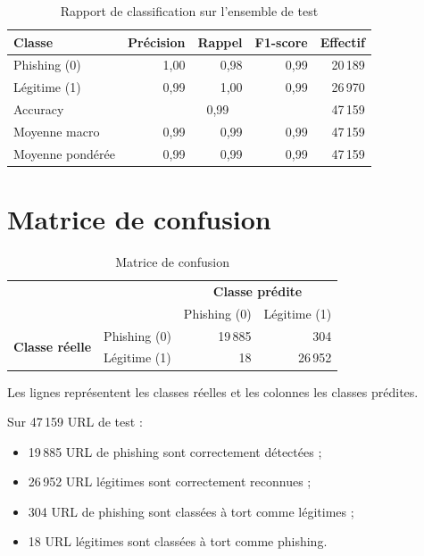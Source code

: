 \documentclass[11pt,a4paper]{report}
\begin{document}
\begin{table}[H]
\centering
\caption{Rapport de classification sur l'ensemble de test}
\begin{tabular}{lrrrr}
\toprule
\textbf{Classe} & \textbf{Précision} & \textbf{Rappel} &
\textbf{F1-score} & \textbf{Effectif}\\
\midrule
Phishing (0) & 1,00 & 0,98 & 0,99 & 20\,189\\
Légitime (1) & 0,99 & 1,00 & 0,99 & 26\,970\\
\midrule
Accuracy & \multicolumn{3}{c}{0,99} & 47\,159\\
Moyenne macro & 0,99 & 0,99 & 0,99 & 47\,159\\
Moyenne pondérée & 0,99 & 0,99 & 0,99 & 47\,159\\
\bottomrule
\end{tabular}
\end{table}

\section{Matrice de confusion}

\begin{table}[H]
\centering
\caption{Matrice de confusion}
\begin{tabular}{llrr}
\toprule
& & \multicolumn{2}{c}{\textbf{Classe prédite}}\\
& & Phishing (0) & Légitime (1)\\
\midrule
\multirow{2}{*}{\textbf{Classe réelle}} & Phishing (0) & 19\,885 & 304\\
& Légitime (1) & 18 & 26\,952\\
\bottomrule
\end{tabular}
\end{table}

\noindent Les lignes représentent les classes réelles et les colonnes les
classes prédites.

Sur 47\,159 URL de test :

\begin{itemize}
  \item 19\,885 URL de phishing sont correctement détectées ;
  \item 26\,952 URL légitimes sont correctement reconnues ;
  \item 304 URL de phishing sont classées à tort comme légitimes ;
  \item 18 URL légitimes sont classées à tort comme phishing.
\end{itemize}
\end{document}
